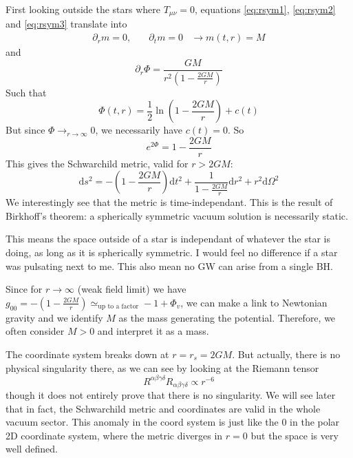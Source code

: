 \documentclass[a4paper]{book}
\theoremstyle{definition}
\theoremstyle{remark}
\begin{document}
First looking outside the stars where $T_{\mu\nu} = 0$, equations \eqref{eq:rsym1}, \eqref{eq:rsym2} and \eqref{eq:rsym3} translate into 
\begin{equation}
    \begin{aligned}
        \partial_r m = 0,&\quad \partial_t m = 0
        &\rightarrow m(t, r) = M
    \end{aligned}
\end{equation}
and
\begin{equation}
    \partial_r \Phi = \frac{GM}{r^2(1 - \frac{2GM}{r})}
\end{equation}
Such that 
\begin{equation}
    \Phi(t, r) = \frac{1}{2}\ln (1-\frac{2GM}{r}) + c(t)
\end{equation}
But since $\Phi \rightarrow_{r \rightarrow \infty} 0$, we necessarily have $c(t) = 0$. So 
\begin{equation}
    e^{2\Phi} = 1-\frac{2GM}{r}
\end{equation}
This gives the Schwarchild metric, valid for $r > 2GM$:
\begin{equation}
    \text{d}s^2 = -\left(1-\frac{2GM}{r}\right) \text{d}t^2 + \frac{1}{1-\frac{2GM}{r}}\text{d}r^2 + r^2 \text{d}\Omega^2 
\end{equation}
We interestingly see that the metric is time-independant. This is the result of Birkhoff's theorem: a spherically symmetric vacuum solution is necessarily static. \par \medskip 

This means the space outside of a star is independant of whatever the star is doing, as long as it is spherically symmetric. I would feel no difference if a star was pulsating next to me. This also mean no GW can arise from a single BH. \par \medskip 

Since for $r\rightarrow \infty$ (weak field limit) we have $g_{00} = -\left(1-\frac{2GM}{r}\right) \simeq_{\text{up to a factor}} -1 + \Phi_v$, we can make a link to Newtonian gravity and we identify $M$ as the mass generating the potential. Therefore, we often consider $M > 0$ and interpret it as a mass. \par \medskip 

The coordinate system breaks down at $r = r_s = 2GM$. But actually, there is no physical singularity there, as we can see by looking at the Riemann tensor 
\begin{equation}
    R^{\alpha\beta\gamma\delta}R_{\alpha\beta\gamma\delta} \propto r^{-6}
\end{equation}
though it does not entirely prove that there is no singularity. We will see later that in fact, the Schwarchild metric and coordinates are valid in the whole vacuum sector. This anomaly in the coord system is just like the 0 in the polar 2D coordinate system, where the metric diverges in $r=0$ but the space is very well defined. \par \medskip 
\end{document}
